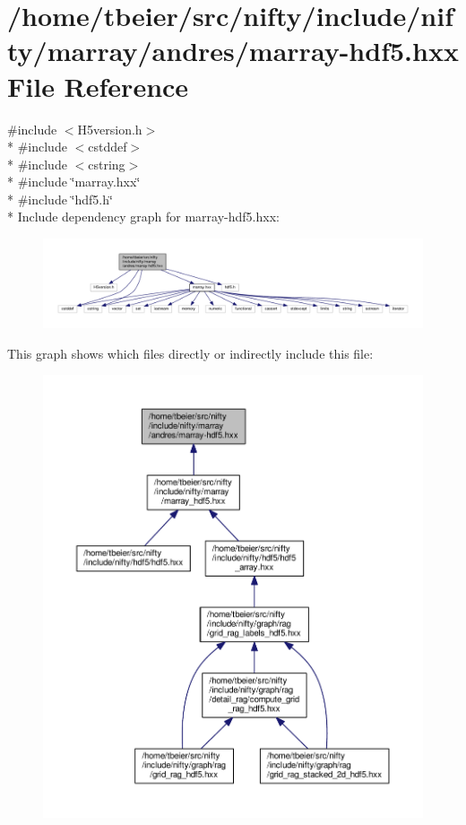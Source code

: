 \hypertarget{marray-hdf5_8hxx}{}\section{/home/tbeier/src/nifty/include/nifty/marray/andres/marray-\/hdf5.hxx File Reference}
\label{marray-hdf5_8hxx}
{\ttfamily \#include $<$H5version.\+h$>$}\\*
{\ttfamily \#include $<$cstddef$>$}\\*
{\ttfamily \#include $<$cstring$>$}\\*
{\ttfamily \#include \char`\"{}marray.\+hxx\char`\"{}}\\*
{\ttfamily \#include \char`\"{}hdf5.\+h\char`\"{}}\\*
Include dependency graph for marray-\/hdf5.hxx\+:\nopagebreak
\begin{figure}[H]
\begin{center}
\leavevmode
\includegraphics[width=350pt]{marray-hdf5_8hxx__incl}
\end{center}
\end{figure}
This graph shows which files directly or indirectly include this file\+:\nopagebreak
\begin{figure}[H]
\begin{center}
\leavevmode
\includegraphics[width=350pt]{marray-hdf5_8hxx__dep__incl}
\end{center}
\end{figure}
